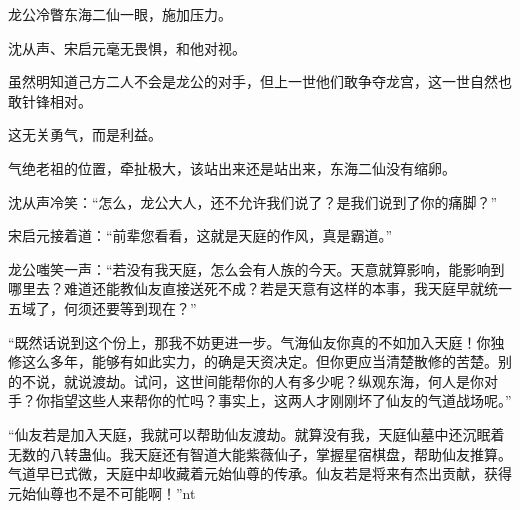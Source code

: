 \begin{this_body}
龙公冷瞥东海二仙一眼，施加压力。

沈从声、宋启元毫无畏惧，和他对视。

虽然明知道己方二人不会是龙公的对手，但上一世他们敢争夺龙宫，这一世自然也敢针锋相对。

这无关勇气，而是利益。

气绝老祖的位置，牵扯极大，该站出来还是站出来，东海二仙没有缩卵。

沈从声冷笑：“怎么，龙公大人，还不允许我们说了？是我们说到了你的痛脚？”

宋启元接着道：“前辈您看看，这就是天庭的作风，真是霸道。”

龙公嗤笑一声：“若没有我天庭，怎么会有人族的今天。天意就算影响，能影响到哪里去？难道还能教仙友直接送死不成？若是天意有这样的本事，我天庭早就统一五域了，何须还要等到现在？”

“既然话说到这个份上，那我不妨更进一步。气海仙友你真的不如加入天庭！你独修这么多年，能够有如此实力，的确是天资决定。但你更应当清楚散修的苦楚。别的不说，就说渡劫。试问，这世间能帮你的人有多少呢？纵观东海，何人是你对手？你指望这些人来帮你的忙吗？事实上，这两人才刚刚坏了仙友的气道战场呢。”

“仙友若是加入天庭，我就可以帮助仙友渡劫。就算没有我，天庭仙墓中还沉眠着无数的八转蛊仙。我天庭还有智道大能紫薇仙子，掌握星宿棋盘，帮助仙友推算。气道早已式微，天庭中却收藏着元始仙尊的传承。仙友若是将来有杰出贡献，获得元始仙尊也不是不可能啊！”nt

\end{this_body}

